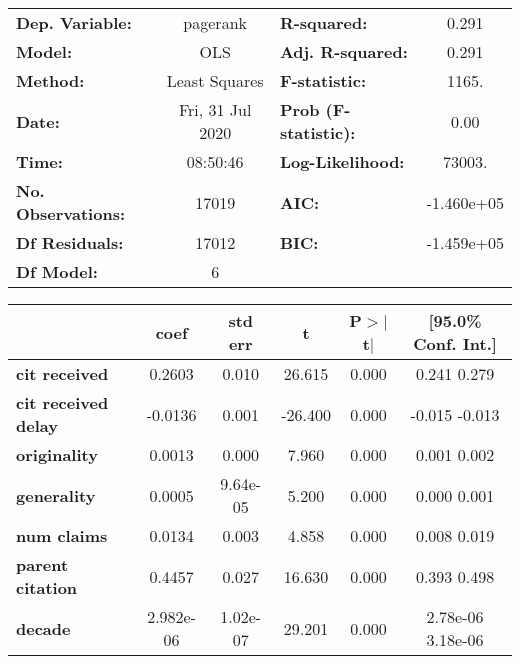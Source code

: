 \begin{center}
\begin{tabular}{lclc}
\toprule
\textbf{Dep. Variable:}     &     pagerank     & \textbf{  R-squared:         } &      0.291    \\
\textbf{Model:}             &       OLS        & \textbf{  Adj. R-squared:    } &      0.291    \\
\textbf{Method:}            &  Least Squares   & \textbf{  F-statistic:       } &      1165.    \\
\textbf{Date:}              & Fri, 31 Jul 2020 & \textbf{  Prob (F-statistic):} &      0.00     \\
\textbf{Time:}              &     08:50:46     & \textbf{  Log-Likelihood:    } &     73003.    \\
\textbf{No. Observations:}  &       17019      & \textbf{  AIC:               } &  -1.460e+05   \\
\textbf{Df Residuals:}      &       17012      & \textbf{  BIC:               } &  -1.459e+05   \\
\textbf{Df Model:}          &           6      & \textbf{                     } &               \\
\bottomrule
\end{tabular}
\begin{tabular}{lccccc}
                            & \textbf{coef} & \textbf{std err} & \textbf{t} & \textbf{P$>$$|$t$|$} & \textbf{[95.0\% Conf. Int.]}  \\
\midrule
\textbf{cit received}       &       0.2603  &        0.010     &    26.615  &         0.000        &         0.241     0.279       \\
\textbf{cit received delay} &      -0.0136  &        0.001     &   -26.400  &         0.000        &        -0.015    -0.013       \\
\textbf{originality}        &       0.0013  &        0.000     &     7.960  &         0.000        &         0.001     0.002       \\
\textbf{generality}         &       0.0005  &     9.64e-05     &     5.200  &         0.000        &         0.000     0.001       \\
\textbf{num claims}         &       0.0134  &        0.003     &     4.858  &         0.000        &         0.008     0.019       \\
\textbf{parent citation}    &       0.4457  &        0.027     &    16.630  &         0.000        &         0.393     0.498       \\
\textbf{decade}             &    2.982e-06  &     1.02e-07     &    29.201  &         0.000        &      2.78e-06  3.18e-06       \\

\end{tabular}
\end{center}
